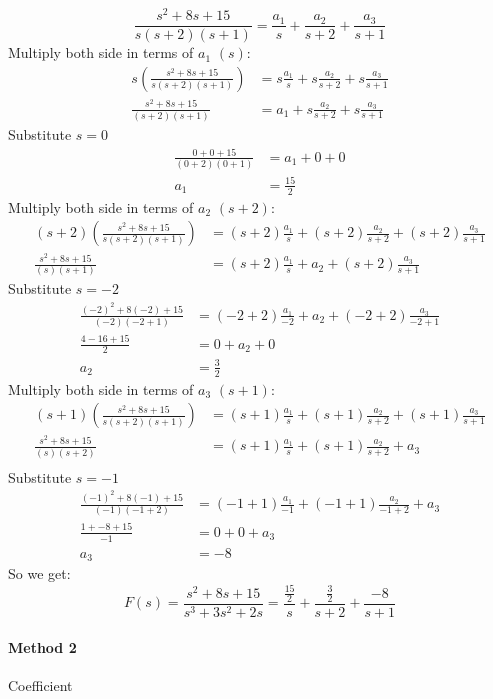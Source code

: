 \[
\frac{s^2+8s+15}{s(s+2)(s+1)} = \frac{a_1}{s} + \frac{a_2}{s+2} + \frac{a_3}{s+1} 
\]
Multiply both side in terms of \(a_1\) \((s)\):
\[
\begin{split}
	s(\frac{s^2+8s+15}{s(s+2)(s+1)}) &= s\frac{a_1}{s} + s\frac{a_2}{s+2} + s\frac{a_3}{s+1} \\
	\frac{s^2+8s+15}{(s+2)(s+1)} &= a_1 + s\frac{a_2}{s+2} + s\frac{a_3}{s+1}
\end{split}
\]
Substitute \(s=0\)
\[
\begin{split}
	\frac{0+0+15}{(0+2)(0+1)} &= a_1 + 0 + 0 \\
	a_1 &= \frac{15}{2}
\end{split}
\]
Multiply both side in terms of \(a_2\) \((s+2)\):
\[
\begin{split}
	(s+2)(\frac{s^2+8s+15}{s(s+2)(s+1)}) &= (s+2)\frac{a_1}{s} + (s+2)\frac{a_2}{s+2} + (s+2)\frac{a_3}{s+1} \\
	\frac{s^2+8s+15}{(s)(s+1)} &= (s+2)\frac{a_1}{s} + a_2 + (s+2)\frac{a_3}{s+1}
\end{split}
\]
Substitute \(s=-2\)
\[
\begin{split}
	\frac{(-2)^2+8(-2)+15}{(-2)(-2+1)} &= (-2+2)\frac{a_1}{-2} + a_2 + (-2+2)\frac{a_3}{-2+1} \\
	\frac{4-16+15}{2} &= 0 + a_2 + 0 \\
	a_2 &= \frac{3}{2}
\end{split}
\]
Multiply both side in terms of \(a_3\) \((s+1)\):
\[
\begin{split}
	(s+1)(\frac{s^2+8s+15}{s(s+2)(s+1)}) &= (s+1)\frac{a_1}{s} + (s+1)\frac{a_2}{s+2} + (s+1)\frac{a_3}{s+1} \\
	\frac{s^2+8s+15}{(s)(s+2)} &= (s+1)\frac{a_1}{s} + (s+1)\frac{a_2}{s+2} + a_3 \\
\end{split}
\]
Substitute \(s=-1\)
\[
\begin{split}
	\frac{(-1)^2+8(-1)+15}{(-1)(-1+2)} &= (-1+1)\frac{a_1}{-1} + (-1+1)\frac{a_2}{-1+2} + a_3 \\
	\frac{1+-8+15}{-1} &= 0 + 0 + a_3 \\
	a_3 &= -8
\end{split}
\]
So we get:
\[
\boxed{F(s) = \frac{s^2+8s+15}{s^3+3s^2+2s} = \frac{\frac{15}{2}}{s} + \frac{\frac{3}{2}}{s+2} + \frac{-8}{s+1}}
\]

\paragraph{Method 2} Coefficient

